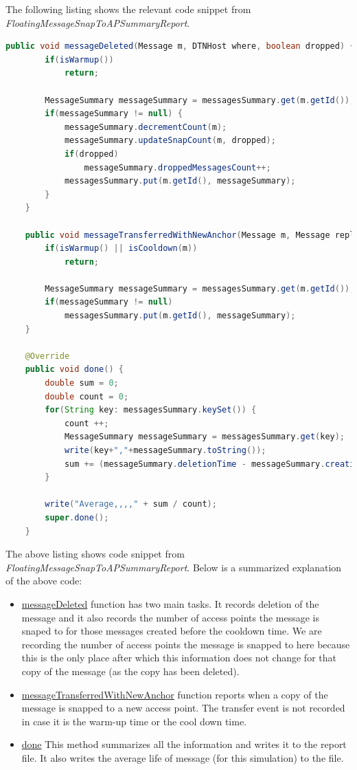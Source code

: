 \vspace{2mm}
The following listing shows the relevant code snippet from \textit{FloatingMessageSnapToAPSummaryReport}.


\begin{lstlisting}[language=java]
	public void messageDeleted(Message m, DTNHost where, boolean dropped) {
		if(isWarmup())
			return;

		MessageSummary messageSummary = messagesSummary.get(m.getId());
		if(messageSummary != null) {
			messageSummary.decrementCount(m);
			messageSummary.updateSnapCount(m, dropped);
			if(dropped)
				messageSummary.droppedMessagesCount++;
			messagesSummary.put(m.getId(), messageSummary);
		}
	}

	public void messageTransferredWithNewAnchor(Message m, Message replicatedWithNewAnchor, DTNHost from, DTNHost to) {
		if(isWarmup() || isCooldown(m))
			return;

		MessageSummary messageSummary = messagesSummary.get(m.getId());
		if(messageSummary != null)
			messagesSummary.put(m.getId(), messageSummary);
	}

	@Override
	public void done() {
	    double sum = 0;
	    double count = 0;
	    for(String key: messagesSummary.keySet()) {
	    	count ++;
	    	MessageSummary messageSummary = messagesSummary.get(key);
	    	write(key+","+messageSummary.toString());
	    	sum += (messageSummary.deletionTime - messageSummary.creationTime) / 60.0;
	    }

	    write("Average,,,," + sum / count);
	    super.done();
	}
\end{lstlisting}
\vspace{5mm}
The above listing shows code snippet from \textit{FloatingMessageSnapToAPSummaryReport}. Below is a summarized explanation of the above code:
\begin{itemize}
	\item \underline{messageDeleted} function has two main tasks. It records deletion of the message and it also records the number of access points the message is snaped to for those messages created before the cooldown time.  We are recording the number of access points the message is snapped to here because this is the only place after which this information does not change for that copy of the message (as the copy has been deleted).
	\item \underline{messageTransferredWithNewAnchor} function reports when a copy of the message is snapped to a new access point. The transfer event is not recorded in case it is the warm-up time or the cool down time.
	\item \underline{done} This method summarizes all the information and writes it to the report file. It also writes the average life of message (for this simulation) to the file.
\end{itemize}

